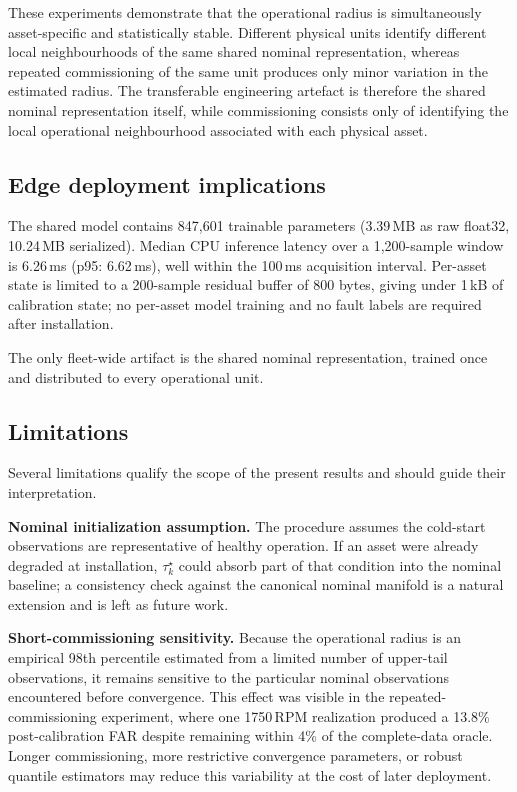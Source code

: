 \documentclass{trbunofficial}
\begin{document}
These experiments demonstrate that the operational radius is simultaneously
asset-specific and statistically stable. Different physical units identify
different local neighbourhoods of the same shared nominal representation,
whereas repeated commissioning of the same unit produces only minor variation
in the estimated radius. The transferable engineering artefact is therefore
the shared nominal representation itself, while commissioning consists only
of identifying the local operational neighbourhood associated with each
physical asset.


\subsection{Edge deployment implications}
\label{sec:edge-results}

The shared model contains 847,601 trainable parameters (3.39\,MB as raw
float32, 10.24\,MB serialized). Median CPU inference latency over a
1,200-sample window is 6.26\,ms (p95: 6.62\,ms), well within the 100\,ms
acquisition interval. Per-asset state is limited to a 200-sample residual
buffer of 800 bytes, giving under 1\,kB of calibration state; no per-asset
model training and no fault labels are required after installation.

The only fleet-wide artifact is the shared nominal representation, trained
once and distributed to every operational unit.

\subsection{Limitations}
\label{sec:limitations}

Several limitations qualify the scope of the present results and should guide their
interpretation.

\textbf{Nominal initialization assumption.} The procedure assumes the cold-start observations are
representative of healthy operation. If an asset were already degraded at installation,
$\tau_k^\star$ could absorb part of that condition into the nominal baseline; a consistency check
against the canonical nominal manifold is a natural extension and is left as future work.

\textbf{Short-commissioning sensitivity.}
Because the operational radius is an empirical 98th percentile estimated
from a limited number of upper-tail observations, it remains sensitive to
the particular nominal observations encountered before convergence. This
effect was visible in the repeated-commissioning experiment, where one
1750\,RPM realization produced a 13.8\% post-calibration FAR despite
remaining within 4\% of the complete-data oracle. Longer commissioning,
more restrictive convergence parameters, or robust quantile estimators may
reduce this variability at the cost of later deployment.
\end{document}
